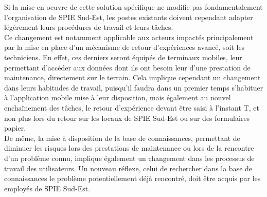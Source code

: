 Si la mise en oeuvre de cette solution spécifique ne modifie pas fondamentalement l’organisation de SPIE Sud-Est, les postes existants doivent cependant adapter légèrement leurs procédures de travail et leurs tâches. \\

Ce changement est notamment applicable aux acteurs impactés principalement par la mise en place d’un mécanisme de retour d’expériences avancé, soit les techniciens. En effet, ces derniers seront équipés de terminaux mobiles, leur permettant d’accéder aux données dont ils ont besoin leur d’une prestation de maintenance, directement sur le terrain. Cela implique cependant un changement dans leurs habitudes de travail, puisqu’il faudra dans un premier temps s’habituer à l’application mobile mise à leur disposition, mais également au nouvel enchaînement des tâches, le retour d’expérience devant être saisi à l’instant T, et non plus lors du retour sur les locaux de SPIE Sud-Est ou sur des formulaires papier. \\

De même, la mise à disposition de la base de connaissances, permettant de diminuer les risques lors des prestations de maintenance ou lors de la rencontre d’un problème connu, implique également un changement dans les processus de travail des utilisateurs. Un nouveau réflexe, celui de rechercher dans la base de connaissances le problème potentiellement déjà rencontré, doit être acquis par les employés de SPIE Sud-Est.
